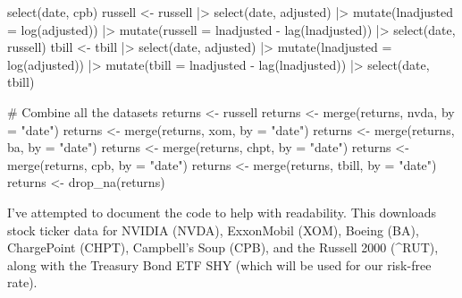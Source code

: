 \documentclass[
  letterpaper,
]{book}
\newenvironment{Shaded}{\begin{snugshade}}{\end{snugshade}}
\newcommand{\AttributeTok}[1]{\textcolor[rgb]{0.40,0.45,0.13}{#1}}
\newcommand{\CommentTok}[1]{\textcolor[rgb]{0.37,0.37,0.37}{#1}}
\newcommand{\FunctionTok}[1]{\textcolor[rgb]{0.28,0.35,0.67}{#1}}
\newcommand{\NormalTok}[1]{\textcolor[rgb]{0.00,0.23,0.31}{#1}}
\newcommand{\OtherTok}[1]{\textcolor[rgb]{0.00,0.23,0.31}{#1}}
\newcommand{\SpecialCharTok}[1]{\textcolor[rgb]{0.37,0.37,0.37}{#1}}
\newcommand{\StringTok}[1]{\textcolor[rgb]{0.13,0.47,0.30}{#1}}
\begin{document}
\begin{Shaded}
\begin{Highlighting}[]
    \FunctionTok{select}\NormalTok{(date, cpb)}
\NormalTok{russell }\OtherTok{\textless{}{-}}\NormalTok{ russell }\SpecialCharTok{|\textgreater{}}  
    \FunctionTok{select}\NormalTok{(date, adjusted) }\SpecialCharTok{|\textgreater{}}  
    \FunctionTok{mutate}\NormalTok{(}\AttributeTok{lnadjusted =} \FunctionTok{log}\NormalTok{(adjusted)) }\SpecialCharTok{|\textgreater{}}  
    \FunctionTok{mutate}\NormalTok{(}\AttributeTok{russell =}\NormalTok{ lnadjusted }\SpecialCharTok{{-}} \FunctionTok{lag}\NormalTok{(lnadjusted)) }\SpecialCharTok{|\textgreater{}}  
    \FunctionTok{select}\NormalTok{(date, russell)}
\NormalTok{tbill }\OtherTok{\textless{}{-}}\NormalTok{ tbill }\SpecialCharTok{|\textgreater{}}  
    \FunctionTok{select}\NormalTok{(date, adjusted) }\SpecialCharTok{|\textgreater{}}  
    \FunctionTok{mutate}\NormalTok{(}\AttributeTok{lnadjusted =} \FunctionTok{log}\NormalTok{(adjusted)) }\SpecialCharTok{|\textgreater{}}  
    \FunctionTok{mutate}\NormalTok{(}\AttributeTok{tbill =}\NormalTok{ lnadjusted }\SpecialCharTok{{-}} \FunctionTok{lag}\NormalTok{(lnadjusted)) }\SpecialCharTok{|\textgreater{}}  
    \FunctionTok{select}\NormalTok{(date, tbill)}

\CommentTok{\# Combine all the datasets}
\NormalTok{returns }\OtherTok{\textless{}{-}}\NormalTok{ russell }
\NormalTok{returns }\OtherTok{\textless{}{-}} \FunctionTok{merge}\NormalTok{(returns, nvda, }\AttributeTok{by =} \StringTok{"date"}\NormalTok{)}
\NormalTok{returns }\OtherTok{\textless{}{-}} \FunctionTok{merge}\NormalTok{(returns, xom, }\AttributeTok{by =} \StringTok{"date"}\NormalTok{)}
\NormalTok{returns }\OtherTok{\textless{}{-}} \FunctionTok{merge}\NormalTok{(returns, ba, }\AttributeTok{by =} \StringTok{"date"}\NormalTok{)}
\NormalTok{returns }\OtherTok{\textless{}{-}} \FunctionTok{merge}\NormalTok{(returns, chpt, }\AttributeTok{by =} \StringTok{"date"}\NormalTok{)}
\NormalTok{returns }\OtherTok{\textless{}{-}} \FunctionTok{merge}\NormalTok{(returns, cpb, }\AttributeTok{by =} \StringTok{"date"}\NormalTok{)}
\NormalTok{returns }\OtherTok{\textless{}{-}} \FunctionTok{merge}\NormalTok{(returns, tbill, }\AttributeTok{by =} \StringTok{"date"}\NormalTok{)}
\NormalTok{returns }\OtherTok{\textless{}{-}} \FunctionTok{drop\_na}\NormalTok{(returns)}
\end{Highlighting}
\end{Shaded}

I've attempted to document the code to help with readability. This
downloads stock ticker data for NVIDIA (NVDA), ExxonMobil (XOM), Boeing
(BA), ChargePoint (CHPT), Campbell's Soup (CPB), and the Russell 2000
(\^{}RUT), along with the Treasury Bond ETF SHY (which will be used for
our risk-free rate).
\end{document}
